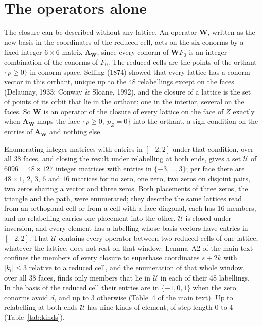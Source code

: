 \documentclass[preprint,pdf]{iucr}          %
\newcommand{\Wop}{\mathbf{W}}
\begin{document}
\section{The operators alone}\label{app:operators}

The closure can be described without any lattice. An operator $\Wop$, written as the new basis in the coordinates of the reduced cell, acts on the six conorms by a fixed integer $6\times6$ matrix $\mathbf A_{\Wop}$, since every conorm of $\Wop F_0$ is an integer combination of the conorms of $F_0$. The reduced cells are the points of the orthant $\{p\ge0\}$ in conorm space. Selling (1874) showed that every lattice has a conorm vector in this orthant, unique up to the 48 relabellings except on the faces (Delaunay, 1933; Conway \& Sloane, 1992), and the closure of a lattice is the set of points of its orbit that lie in the orthant: one in the interior, several on the faces. So $\Wop$ is an operator of the closure of every lattice on the face of $Z$ exactly when $\mathbf A_{\Wop}$ maps the face $\{p\ge0,\ p_Z=0\}$ into the orthant, a sign condition on the entries of $\mathbf A_{\Wop}$ and nothing else.

Enumerating integer matrices with entries in $[-2,2]$ under that condition, over all 38 faces, and closing the result under relabelling at both ends, gives a set $\mathcal U$ of $6096=48\times127$ integer matrices with entries in $\{-3,\dots,3\}$; per face there are $48\times1$, $2$, $3$, $6$ and $16$ matrices for no zero, one zero, two zeros on disjoint pairs, two zeros sharing a vector and three zeros. Both placements of three zeros, the triangle and the path, were enumerated; they describe the same lattices read from an orthogonal cell or from a cell with a face diagonal, each has 16 members, and no relabelling carries one placement into the other. $\mathcal U$ is closed under inversion, and every element has a labelling whose basis vectors have entries in $[-2,2]$. That $\mathcal U$ contains every operator between two reduced cells of one lattice, whatever the lattice, does not rest on that window: Lemma~A2 of the main text confines the members of every closure to superbase coordinates $s+2k$ with $|k_i|\le3$ relative to a reduced cell, and the enumeration of that whole window, over all 38 faces, finds only members that lie in $\mathcal U$ in each of their 48 labellings. In the basis of the reduced cell their entries are in $\{-1,0,1\}$ when the zero conorms avoid $d$, and up to $3$ otherwise (Table~4 of the main text). Up to relabelling at both ends $\mathcal U$ has nine kinds of element, of step length $0$ to $4$ (Table~\ref{tab:kinds}).
\end{document}
